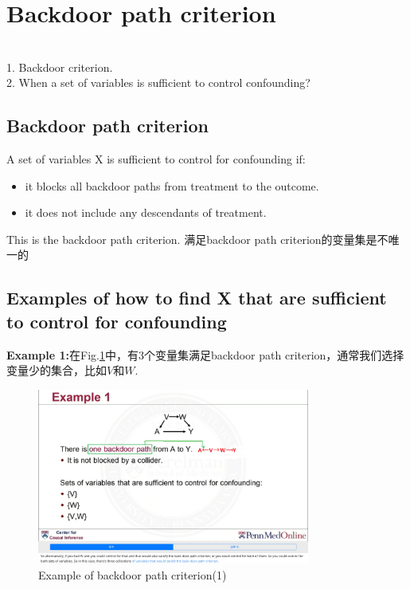 \section{Backdoor path criterion}
\\
1. Backdoor criterion.\\
2. When a set of variables is sufficient to control confounding?

\subsection{Backdoor path criterion}
A set of variables X is sufficient to control for confounding if:
\begin{itemize}
	\item it blocks all backdoor paths from treatment to the outcome.
	\item it does not include any descendants of treatment.
\end{itemize}
This is the {\color{red} backdoor path criterion.} 满足backdoor path criterion的变量集是{\color{red}不唯一的
}

\subsection{Examples of how to find X that are sufficient to control for confounding}
{\bfseries Example 1:}在Fig.\ref{bkdrcrtex1}中，有3个变量集满足backdoor path criterion，通常我们选择变量少的集合，比如${V}$和${W}$.
	\begin{figure}[htbp]
	\setlength{\abovecaptionskip}{0pt}     %
	\setlength{\belowcaptionskip}{10pt}
	\vspace{-0cm}  %
	\setlength{\abovecaptionskip}{-0cm}   %
	\setlength{\belowcaptionskip}{-0cm}   %
	\centering
	\includegraphics[width=0.8\textwidth]{figure/bkdrcrtex1.png}
	\caption{Example of backdoor path criterion(1)}
	\label{bkdrcrtex1}
\end{figure}



